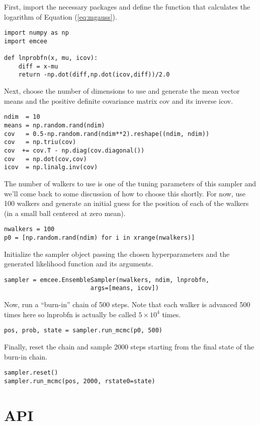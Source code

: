 \documentclass[12pt,preprint]{aastex}
\newcommand{\code}[1]{{\sffamily #1}}
\newcommand{\eq}[1]{Equation (\ref{eq:#1})}
\newcommand{\sectlabel}[1]{\label{sect:#1}}
\begin{document}
First, import the necessary packages and define the function that calculates
the logarithm of \eq{mgauss}.
\begin{lstlisting}
import numpy as np
import emcee

def lnprobfn(x, mu, icov):
    diff = x-mu
    return -np.dot(diff,np.dot(icov,diff))/2.0
\end{lstlisting}
Next, choose the number of dimensions to use and generate the mean vector
\code{means} and the positive definite covariance matrix \code{cov} and its
inverse \code{icov}.
\begin{lstlisting}
ndim  = 10
means = np.random.rand(ndim)
cov   = 0.5-np.random.rand(ndim**2).reshape((ndim, ndim))
cov   = np.triu(cov)
cov  += cov.T - np.diag(cov.diagonal())
cov   = np.dot(cov,cov)
icov  = np.linalg.inv(cov)
\end{lstlisting}
The number of walkers to use is one of the tuning parameters of this sampler
and we'll come back to some discussion of how to choose this shortly. For
now, use 100 walkers and generate an initial guess for the position of each
of the walkers (in a small ball centered at zero mean).
\begin{lstlisting}
nwalkers = 100
p0 = [np.random.rand(ndim) for i in xrange(nwalkers)]
\end{lstlisting}
Initialize the sampler object passing the chosen hyperparameters and the
generated likelihood function and its arguments.
\begin{lstlisting}
sampler = emcee.EnsembleSampler(nwalkers, ndim, lnprobfn,
                        args=[means, icov])
\end{lstlisting}
Now, run a ``burn-in'' chain of 500 steps. Note that each walker is advanced
500 times here so \code{lnprobfn} is actually be called $5\times10^4$ times.
\begin{lstlisting}
pos, prob, state = sampler.run_mcmc(p0, 500)
\end{lstlisting}
Finally, reset the chain and sample 2000 steps starting from the final state
of the burn-in chain.
\begin{lstlisting}
sampler.reset()
sampler.run_mcmc(pos, 2000, rstate0=state)
\end{lstlisting}

\clearpage

\section{API}\sectlabel{api}
\end{document}
